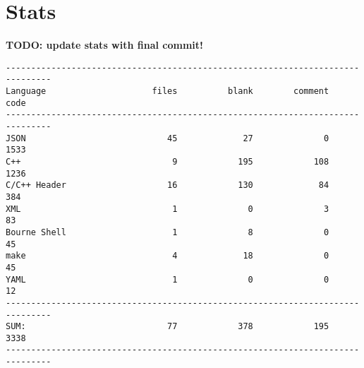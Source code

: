 \documentclass[paper=a4, fontsize=11pt, abstract=on]{scrartcl} %
\numberwithin{equation}{section} %
\numberwithin{figure}{section} %
\numberwithin{table}{section} %
\begin{document}
\section{Stats}

\textbf{TODO: update stats with final commit!}

\begin{verbatim}
-------------------------------------------------------------------------------
Language                     files          blank        comment           code
-------------------------------------------------------------------------------
JSON                            45             27              0           1533
C++                              9            195            108           1236
C/C++ Header                    16            130             84            384
XML                              1              0              3             83
Bourne Shell                     1              8              0             45
make                             4             18              0             45
YAML                             1              0              0             12
-------------------------------------------------------------------------------
SUM:                            77            378            195           3338
-------------------------------------------------------------------------------
\end{verbatim}
\end{document}
